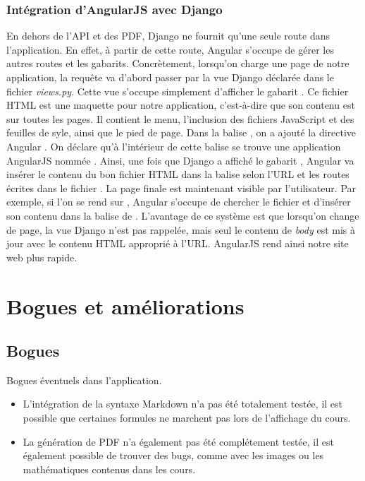 \documentclass[a4paper,10pt,twoside]{sphinxmanual}
\begin{document}
\subsection{Intégration d'AngularJS avec Django}
\label{guide:integration-d-angularjs-avec-django}
En dehors de l'API et des PDF, Django ne fournit qu'une seule route dans l'application. En effet, à partir de cette route, Angular s'occupe de gérer les autres routes et les gabarits. Concrètement, lorsqu'on charge une page de notre application, la requête va d'abord passer par la vue Django  déclarée dans le fichier \emph{views.py}. Cette vue s'occupe simplement d'afficher le gabarit . Ce fichier HTML est une maquette pour notre application, c'est-à-dire que son contenu est sur toutes les pages. Il contient le menu, l'inclusion des fichiers JavaScript et des feuilles de syle, ainsi que le pied de page. Dans la balise , on a ajouté la directive Angular . On déclare qu'à l'intérieur de cette balise se trouve une application AngularJS nommée . Ainsi, une fois que Django a affiché le gabarit , Angular va insérer le contenu du bon fichier HTML dans la balise  selon l'URL et les routes écrites dans le fichier . La page finale est maintenant visible par l'utilisateur. Par exemple, si l'on se rend sur , Angular s'occupe de chercher le fichier  et d'insérer son contenu dans la balise  de . L'avantage de ce système est que lorsqu'on change de page, la vue Django n'est pas rappelée, mais seul le contenu de \emph{body} est mis à jour avec le contenu HTML approprié à l'URL. AngularJS rend ainsi notre site web plus rapide.


\chapter{Bogues et améliorations}
\label{bugs::doc}\label{bugs:bogues-et-ameliorations}

\section{Bogues}
\label{bugs:bogues}
Bogues éventuels dans l'application.
\begin{itemize}
\item {} 
L'intégration de la syntaxe Markdown n'a pas été totalement testée, il est possible que certaines formules ne marchent pas lors de l'affichage du cours.

\item {} 
La génération de PDF n'a également pas été complétement testée, il est également possible de trouver des bugs, comme avec les images ou  les mathématiques contenus dans les cours.

\end{itemize}
\end{document}
